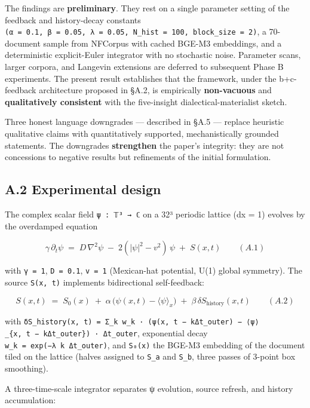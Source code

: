 \documentclass[
]{article}
\begin{document}
The findings are \textbf{preliminary}. They rest on a single parameter
setting of the feedback and history-decay constants
\texttt{(α\ =\ 0.1,\ β\ =\ 0.05,\ λ\ =\ 0.05,\ N\_hist\ =\ 100,\ block\_size\ =\ 2)},
a 70-document sample from NFCorpus with cached BGE-M3 embeddings, and a
deterministic explicit-Euler integrator with no stochastic noise.
Parameter scans, larger corpora, and Langevin extensions are deferred to
subsequent Phase B experiments. The present result establishes that the
framework, under the b+c-feedback architecture proposed in §A.2, is
empirically \textbf{non-vacuous} and \textbf{qualitatively consistent}
with the five-insight dialectical-materialist sketch.

Three honest language downgrades --- described in §A.5 --- replace
heuristic qualitative claims with quantitatively supported,
mechanistically grounded statements. The downgrades \textbf{strengthen}
the paper's integrity: they are not concessions to negative results but
refinements of the initial formulation.

\hypertarget{a.2-experimental-design}{%
\subsection{A.2 Experimental design}\label{a.2-experimental-design}}

The complex scalar field \texttt{ψ\ :\ 𝕋³\ →\ ℂ} on a 32³ periodic
lattice (dx = 1) evolves by the overdamped equation

\[\gamma\, \partial_t \psi \;=\; D\,\nabla^2 \psi \;-\; 2(|\psi|^2 - v^2)\,\psi \;+\; S(x, t) \qquad (A.1)\]

with \texttt{γ\ =\ 1}, \texttt{D\ =\ 0.1}, \texttt{v\ =\ 1} (Mexican-hat
potential, U(1) global symmetry). The source \texttt{S(x,\ t)}
implements bidirectional self-feedback:

\[S(x, t) \;=\; S_0(x) \;+\; \alpha\,\bigl(\psi(x, t) - \langle \psi \rangle_x\bigr) \;+\; \beta\,\delta S_{\text{history}}(x, t) \qquad (A.2)\]

with
\texttt{δS\_history(x,\ t)\ =\ Σ\_k\ w\_k\ ·\ (ψ(x,\ t\ −\ kΔt\_outer)\ −\ ⟨ψ⟩\_\{x,\ t\ −\ kΔt\_outer\})\ ·\ Δt\_outer},
exponential decay \texttt{w\_k\ =\ exp(−λ\ k\ Δt\_outer)}, and
\texttt{S₀(x)} the BGE-M3 embedding of the document tiled on the lattice
(halves assigned to \texttt{S\_a} and \texttt{S\_b}, three passes of
3-point box smoothing).

A three-time-scale integrator separates ψ evolution, source refresh, and
history accumulation:
\end{document}
